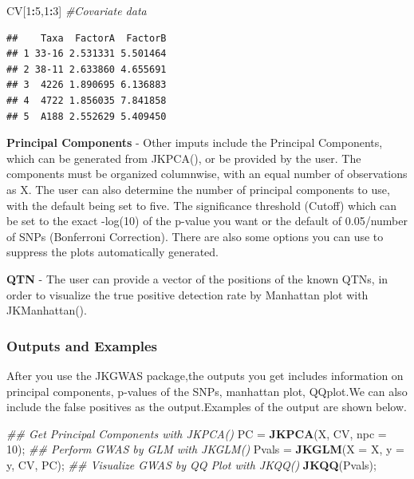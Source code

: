 \documentclass[
]{article}
\newenvironment{Shaded}{\begin{snugshade}}{\end{snugshade}}
\newcommand{\CommentTok}[1]{\textcolor[rgb]{0.56,0.35,0.01}{\textit{#1}}}
\newcommand{\DataTypeTok}[1]{\textcolor[rgb]{0.13,0.29,0.53}{#1}}
\newcommand{\DecValTok}[1]{\textcolor[rgb]{0.00,0.00,0.81}{#1}}
\newcommand{\KeywordTok}[1]{\textcolor[rgb]{0.13,0.29,0.53}{\textbf{#1}}}
\newcommand{\NormalTok}[1]{#1}
\newcommand{\OperatorTok}[1]{\textcolor[rgb]{0.81,0.36,0.00}{\textbf{#1}}}
\newcommand{\StringTok}[1]{\textcolor[rgb]{0.31,0.60,0.02}{#1}}
\begin{document}
\begin{Shaded}
\begin{Highlighting}[]
\NormalTok{CV[}\DecValTok{1}\OperatorTok{:}\DecValTok{5}\NormalTok{,}\DecValTok{1}\OperatorTok{:}\DecValTok{3}\NormalTok{] }\CommentTok{\#Covariate data}
\end{Highlighting}
\end{Shaded}

\begin{verbatim}
##    Taxa  FactorA  FactorB
## 1 33-16 2.531331 5.501464
## 2 38-11 2.633860 4.655691
## 3  4226 1.890695 6.136883
## 4  4722 1.856035 7.841858
## 5  A188 2.552629 5.409450
\end{verbatim}

\textbullet \textbf{Principal Components} - Other imputs include the
Principal Components, which can be generated from JKPCA(), or be
provided by the user. The components must be organized columnwise, with
an equal number of observations as X. The user can also determine the
number of principal components to use, with the default being set to
five. The significance threshold (Cutoff) which can be set to the exact
-log(10) of the p-value you want or the default of 0.05/number of SNPs
(Bonferroni Correction). There are also some options you can use to
suppress the plots automatically generated.

\par

\textbullet \textbf{QTN} - The user can provide a vector of the
positions of the known QTNs, in order to visualize the true positive
detection rate by Manhattan plot with JKManhattan().

\hypertarget{outputs-and-examples}{%
\subsubsection{\texorpdfstring{\textbf{Outputs and
Examples}}{Outputs and Examples}}\label{outputs-and-examples}}

After you use the JKGWAS package,the outputs you get includes
information on principal components, p-values of the SNPs, manhattan
plot, QQplot.We can also include the false positives as the
output.Examples of the output are shown below.

\begin{Shaded}
\begin{Highlighting}[]
\CommentTok{\#\# Get Principal Components with JKPCA()}
\NormalTok{PC =}\StringTok{ }\KeywordTok{JKPCA}\NormalTok{(X, CV, }\DataTypeTok{npc =} \DecValTok{10}\NormalTok{);}
\CommentTok{\#\# Perform GWAS by GLM with JKGLM()}
\NormalTok{Pvals =}\StringTok{ }\KeywordTok{JKGLM}\NormalTok{(}\DataTypeTok{X =}\NormalTok{ X, }\DataTypeTok{y =}\NormalTok{ y, CV, PC);}
\CommentTok{\#\# Visualize GWAS by QQ Plot with JKQQ()}
\KeywordTok{JKQQ}\NormalTok{(Pvals);}
\end{Highlighting}
\end{Shaded}
\end{document}

